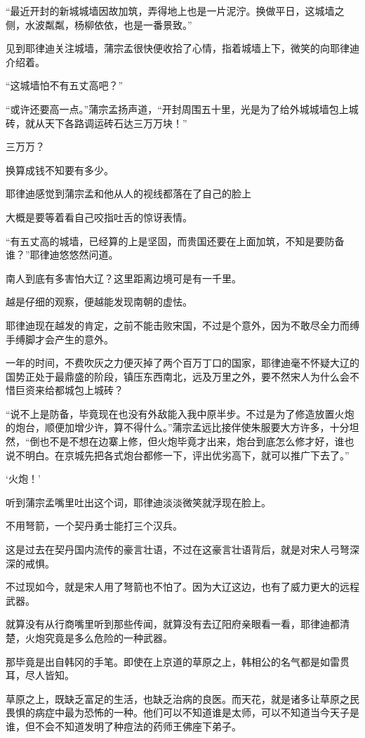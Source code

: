 “最近开封的新城城墙因故加筑，弄得地上也是一片泥泞。换做平日，这城墙之侧，水波粼粼，杨柳依依，也是一番景致。”

见到耶律迪关注城墙，蒲宗孟很快便收拾了心情，指着城墙上下，微笑的向耶律迪介绍着。

“这城墙怕不有五丈高吧？”

“或许还要高一点。”蒲宗孟扬声道，“开封周围五十里，光是为了给外城城墙包上城砖，就从天下各路调运砖石达三万万块！”

三万万？

换算成钱不知要有多少。

耶律迪感觉到蒲宗孟和他从人的视线都落在了自己的脸上

大概是要等着看自己咬指吐舌的惊讶表情。

“有五丈高的城墙，已经算的上是坚固，而贵国还要在上面加筑，不知是要防备谁？”耶律迪悠悠然问道。

南人到底有多害怕大辽？这里距离边境可是有一千里。

越是仔细的观察，便越能发现南朝的虚怯。

耶律迪现在越发的肯定，之前不能击败宋国，不过是个意外，因为不敢尽全力而缚手缚脚才会产生的意外。

一年的时间，不费吹灰之力便灭掉了两个百万丁口的国家，耶律迪毫不怀疑大辽的国势正处于最鼎盛的阶段，镇压东西南北，远及万里之外，要不然宋人为什么会不惜巨资来给都城包上城砖？

“说不上是防备，毕竟现在也没有外敌能入我中原半步。不过是为了修造放置火炮的炮台，顺便加增少许，算不得什么。”蒲宗孟远比接伴使朱服要大方许多，十分坦然，“倒也不是不想在边寨上修，但火炮毕竟才出来，炮台到底怎么修才好，谁也说不明白。在京城先把各式炮台都修一下，评出优劣高下，就可以推广下去了。”

‘火炮！’

听到蒲宗孟嘴里吐出这个词，耶律迪淡淡微笑就浮现在脸上。

不用弩箭，一个契丹勇士能打三个汉兵。

这是过去在契丹国内流传的豪言壮语，不过在这豪言壮语背后，就是对宋人弓弩深深的戒惧。

不过现如今，就是宋人用了弩箭也不怕了。因为大辽这边，也有了威力更大的远程武器。

就算没有从行商嘴里听到那些传闻，就算没有去辽阳府亲眼看一看，耶律迪都清楚，火炮究竟是多么危险的一种武器。

那毕竟是出自韩冈的手笔。即使在上京道的草原之上，韩相公的名气都是如雷贯耳，尽人皆知。

草原之上，既缺乏富足的生活，也缺乏治病的良医。而天花，就是诸多让草原之民畏惧的病症中最为恐怖的一种。他们可以不知道谁是太师，可以不知道当今天子是谁，但不会不知道发明了种痘法的药师王佛座下弟子。

